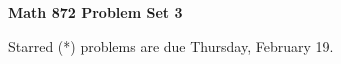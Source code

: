 \documentclass[12pt]{article}
\begin{document}
\def\ctln{\centerline}
\def\msk{\medskip}
\def\bsk{\bigskip}
\def\ssk{\smallskip}
\def\hsk{\hskip.3in}
\def\ra{\rightarrow}
\def\ubr{\underbar}

\def\mt{{\mathcal T}}
\def\mb{{\mathcal B}}
\def\ms{{\mathcal S}}
\def\mu{{\mathcal U}}
\def\mv{{\mathcal V}}

\def\bbr{{\mathbb R}}
\def\bbz{{\mathbb Z}}
\def\bbq{{\mathbb Q}}
\def\spc{$~$\hskip.15in$~$}

\def\sset{\subseteq}
\def\del{\partial}
\def\lra{$\Leftrightarrow$}
\def\bra{$\Rightarrow$}




\ctln{\bf Math 872 Problem Set 3}

\msk

Starred (*) problems are due Thursday, February 19.
\end{document}
